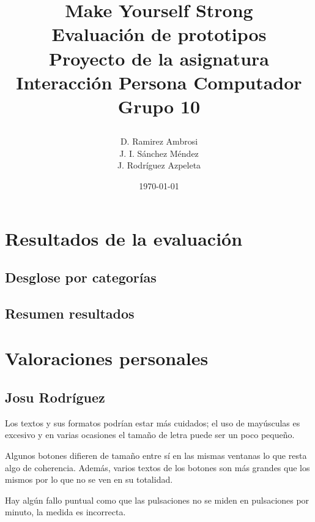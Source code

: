 \documentclass[a4paper]{article}
\date{}
\author{D. Ramirez Ambrosi \\ J. I. Sánchez Méndez \\ J. Rodríguez Azpeleta}
\title{\begin{center}
\textbf{\Huge{Make Yourself Strong}} \\ Evaluación de prototipos  \\Proyecto de la asignatura Interacción Persona Computador \\ \Huge{Grupo 10}
\end{center}}
\date{\today}
\renewcommand\listfigurename{\centering LISTA DE FIGURAS}
\begin{document}
\maketitle

\thispagestyle{empty}%
\newpage
\tableofcontents%
\thispagestyle{empty}
\newpage





\setcounter{page}{1}%


\section{Resultados de la evaluación}

\subsection{Desglose por categorías}

\subsection{Resumen resultados}

\section{Valoraciones personales}

\subsection{Josu Rodríguez}

Los textos y sus formatos podrían estar más cuidados; el uso de mayúsculas es excesivo y en varias ocasiones el tamaño de letra puede ser un poco pequeño.

Algunos botones difieren de tamaño entre sí en las mismas ventanas lo que resta algo de coherencia. Además, varios textos de los botones son más grandes que los mismos por lo que no se ven en su totalidad.

Hay algún fallo puntual como que las pulsaciones no se miden en pulsaciones por minuto, la medida es incorrecta. 
\end{document}
